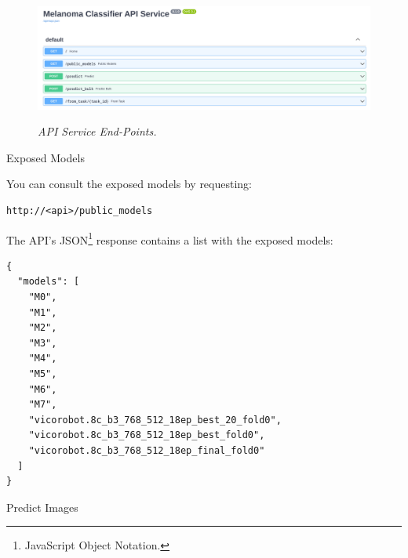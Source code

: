 \documentclass[dvipsnames,mathserif]{beamer}
\begin{document}
{\begin{frame}[fragile]
      \begin{figure}[H]
        \centering
        \begin{adjustbox}{width=0.8\textwidth, trim={0cm 0cm 0.1cm 0cm}, clip}
          \includegraphics[width=\textwidth]{images/api-endpoints.png}
        \end{adjustbox}
        \caption[API Service End-Points]{\textit{API Service End-Points. }}
        {\label{fig:api-endpoints}}
      \end{figure}
    \end{frame}



    \begin{frame}[fragile]
      \large Exposed Models

      \vspace{0.25cm}
      \footnotesize
      You can consult the exposed models by requesting:

      \vspace{0.1cm}

      \begin{Verbatim}[fontsize=\tiny]
http://<api>/public_models
      \end{Verbatim}

      The API's JSON\footnote{JavaScript Object Notation.} response contains
      a list with the exposed models:

      \vspace{0.1cm}

      \begin{Verbatim}[fontsize=\tiny]
{
  "models": [
    "M0",
    "M1",
    "M2",
    "M3",
    "M4",
    "M5",
    "M6",
    "M7",
    "vicorobot.8c_b3_768_512_18ep_best_20_fold0",
    "vicorobot.8c_b3_768_512_18ep_best_fold0",
    "vicorobot.8c_b3_768_512_18ep_final_fold0"
  ]
}
      \end{Verbatim}

    \end{frame}


    \begin{frame}[fragile]
      \large Predict Images


\end{frame}}
\end{document}
